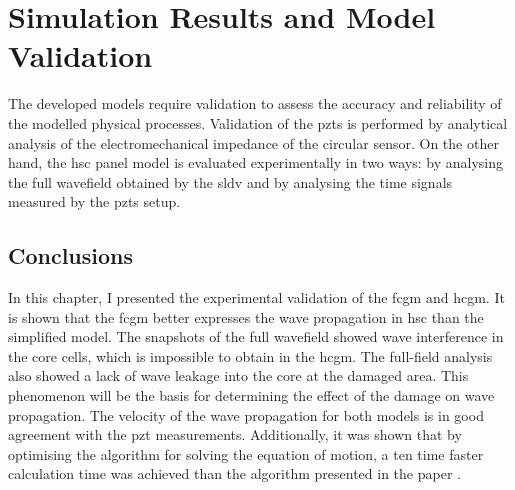 
\chapter[Simulation Results and Model Validation]{Simulation Results and Model Validation}
\label{ch:validation}

The developed models require validation to assess the accuracy and reliability of the modelled physical processes.
Validation of the \acp{pzt} is performed by analytical analysis of the electromechanical impedance of the circular sensor. 
On the other hand, the \ac{hsc} panel model is evaluated experimentally in two ways: by analysing the full wavefield obtained by the \ac{sldv} and by analysing the time signals measured by the \acp{pzt} setup.




\section{Conclusions}
\label{sec:conclusionsValid}

In this chapter, I presented the experimental validation of the \ac{fcgm} and \ac{hcgm}.
It is shown that the \ac{fcgm} better expresses the wave propagation in \ac{hsc} than the simplified model.
The snapshots of the full wavefield showed wave interference in the core cells, which is impossible to obtain in the \ac{hcgm}.
The full-field analysis also showed a lack of wave leakage into the core at the damaged area.
This phenomenon will be the basis for determining the effect of the damage on wave propagation.
The velocity of the wave propagation for both models is in good agreement with the \ac{pzt} measurements.
Additionally, it was shown that by optimising the algorithm for solving the equation of motion, a ten time faster calculation time was achieved than the algorithm presented in the paper \cite{kudela2020parallel}.